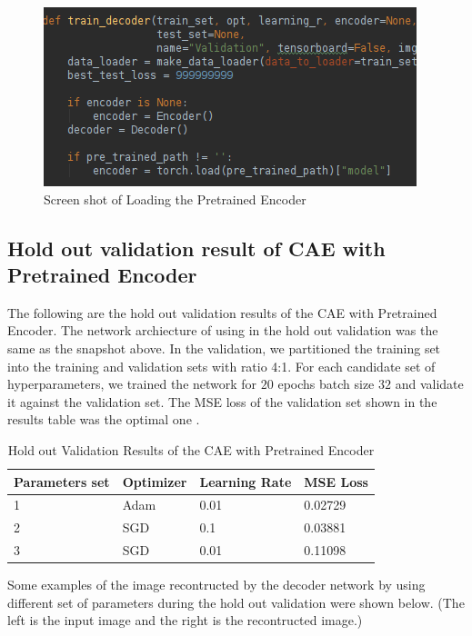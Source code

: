 \documentclass{article}
\begin{document}
\pagebreak


\begin{figure}[h]
  \centering
  \includegraphics[scale=1]{load_model_de.png}
  \caption{Screen shot of Loading the Pretrained Encoder}
\end{figure}



\subsection{Hold out validation result of CAE with Pretrained Encoder}

The following are the hold out validation results of the CAE with Pretrained Encoder. The network archiecture of using in the hold out validation was the same as the snapshot above. In the validation, we partitioned the training set into the training and validation sets with ratio 4:1. For each candidate set of hyperparameters, we trained the network for $20$ epochs batch size $32$ and validate it against the validation set. The MSE loss of the validation set shown in the results table was the optimal one .


\begin{table}[htb]
\caption{Hold out Validation Results of the CAE with Pretrained Encoder}
	\label{sample-table}
	\centering
\begin{tabular}{llll}
\toprule
		\cmidrule{1-4}
		Parameters set& Optimizer & Learning Rate & MSE Loss\\
		\midrule
 			1 & Adam & 0.01 & 0.02729 \\
 			2 & SGD & 0.1 &  0.03881 \\
 			3 & SGD & 0.01 & 0.11098 \\
\bottomrule
\end{tabular}
\end{table}

Some examples of the image recontructed by the decoder network by using different set of parameters during the hold out validation were shown below.
(The left is the input image and the right is the recontructed image.)
\end{document}
